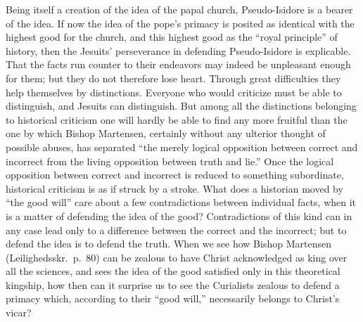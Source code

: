 \documentclass[12pt]{book}
\newcommand{\opage}[1]{\marginnote{\footnotesize\textit{[#1]}}}
\begin{document}
Being itself a creation of the idea of the papal church, Pseudo-Isidore is a bearer of the idea. If now the idea of the pope's primacy is posited as identical with the highest good for the church, and this highest good as the ``royal principle'' of history, then the Jesuits' perseverance in defending Pseudo-Isidore is explicable. That the facts run counter to their endeavors may indeed be unpleasant enough for them; but they do not therefore lose heart.
\opage{44}\setcounter{footnote}{0}%
Through great difficulties they help themselves by distinctions. Everyone who would criticize must be able to distinguish, and Jesuits can distinguish. But among all the distinctions belonging to historical criticism one will hardly be able to find any more fruitful than the one by which Bishop Martensen, certainly without any ulterior thought of possible abuses, has separated ``the merely logical opposition between correct and incorrect from the living opposition between truth and lie.'' Once the logical opposition between correct and incorrect is reduced to something subordinate, historical criticism is as if struck by a stroke. What does a historian moved by ``the good will'' care about a few contradictions between individual facts, when it is a matter of defending the idea of the good? Contradictions of this kind can in any case lead only to a difference between the correct and the incorrect; but to defend the idea is to defend the truth. When we see how Bishop Martensen (Leilighedsskr.\ p.~80) can be zealous to have Christ acknowledged as king over all the sciences, and sees the idea of the good satisfied only in this theoretical kingship, how then can it surprise us to see the Curialists zealous to defend a primacy which, according to their ``good will,'' necessarily belongs to Christ's vicar?
\end{document}
